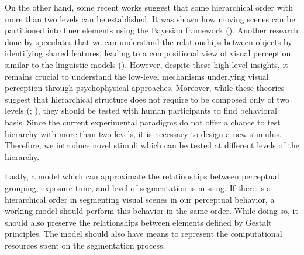 \documentclass{article}
\begin{document}
On the other hand, some recent works suggest that some hierarchical order with more than two levels can be established. It was shown how moving scenes can be partitioned into finer elements using the Bayesian framework (\cite{RN177}). Another research done by \citeauthor{hafri_green_firestone_2023} speculates that we can understand the relationships between objects by identifying shared features, leading to a compositional view of visual perception similar to the linguistic models (\citeyear{hafri_green_firestone_2023}). However, despite these high-level insights, it remains crucial to understand the low-level mechanisms underlying visual perception through psychophysical approaches. Moreover, while these theories suggest that hierarchical structure  does not require to be composed only of two levels (\cite{RN236}; \cite{RN177}), they should be tested with human participants to find behavioral basis. Since the current experimental paradigms do not offer a chance to test hierarchy with more than two levels, it is necessary to design a new stimulus. Therefore, we introduce novel stimuli which can be tested at different levels of the hierarchy. 

Lastly, a model which can approximate the relationships between perceptual grouping,  exposure time, and level of segmentation is missing. If there is a hierarchical order in segmenting visual scenes in our perceptual behavior, a working model should perform this behavior in the same order. While doing so, it should also preserve the relationships between elements defined by Gestalt principles. The model should also have means to represent the computational resources spent on the segmentation process.
\end{document}
